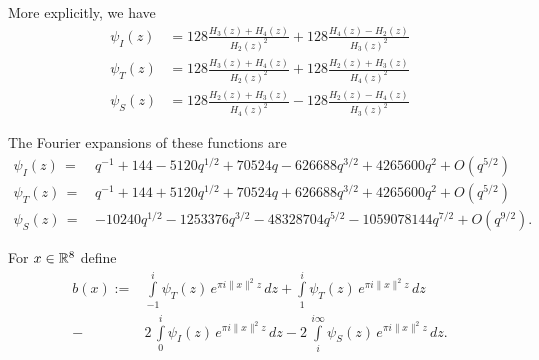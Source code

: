\begin{lemma}\label{lemma: psi I psi T psi S explicit}
More explicitly, we have
\begin{align}
    \psi_I(z) &= 128 \frac{H_3(z) + H_4(z)}{H_2(z)^2} + 128 \frac{H_4(z) - H_2(z)}{H_3(z)^2} \label{eqn:psiI-explicit} \\
    \psi_T(z) &= 128 \frac{H_3(z) + H_4(z)}{H_2(z)^2} + 128 \frac{H_2(z) + H_3(z)}{H_4(z)^2} \label{eqn:psiT-explicit} \\
    \psi_S(z) &= 128 \frac{H_2(z) + H_3(z)}{H_4(z)^2} - 128 \frac{H_2(z) - H_4(z)}{H_3(z)^2} \label{eqn:psiS-explicit}
\end{align}
\end{lemma}

\begin{lemma}\label{lemma:psiI-psiT-psiS-fourier}
The Fourier expansions of these functions are
\begin{align}
    \psi_I(z)\,=\,&q^{-1} + 144 - 5120 q^{1/2} + 70524 q - 626688 q^{3/2} + 4265600 q^2 + O(q^{5/2}) \label{eqn: psi fourier I}\\
    \psi_T(z)\,=\,&q^{-1} + 144 + 5120 q^{1/2} + 70524 q + 626688 q^{3/2} + 4265600 q^2 + O(q^{5/2}) \label{eqn: psi fourier T}\\
    \psi_S(z)\,=\,&-10240 q^{1/2} - 1253376 q^{3/2} - 48328704 q^{5/2} - 1059078144 q^{7/2}+O(q^{9/2}).\label{eqn: psi fourier S}
\end{align}
\end{lemma}
\begin{definition}\label{def:b-definition}
For $x\in\mathbb{R}^8$ define
\begin{align}\label{eqn:b-definition}
    b(x):= & \int\limits_{-1}^{i}\psi_T(z)\,e^{\pi i \|x\|^2 z}\,dz
        + \int\limits_{1}^{i}\psi_T(z)\,e^{\pi i \|x\|^2 z}\,dz \\
    -& 2\,\int\limits_{0}^{i}\psi_I(z)\,e^{\pi i \|x\|^2 z}\,dz
    - 2\,\int\limits_{i}^{i\infty}\psi_S(z)\,e^{\pi i \|x\|^2 z}\,dz \nonumber.
\end{align}
\end{definition}

